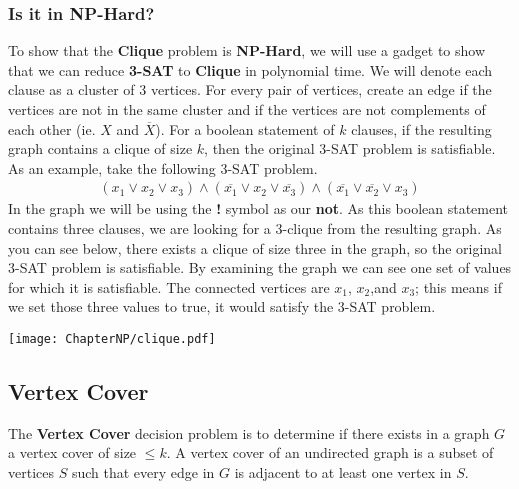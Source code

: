     \subsubsection{Is it in NP-Hard?}
        To show that the \textbf{Clique} problem is \textbf{NP-Hard}, we will use a gadget to show that we can reduce \textbf{3-SAT} to \textbf{Clique} in polynomial time. We will denote each clause as a cluster of 3 vertices. For every pair of vertices, create an edge if the vertices are not in the same cluster and if the vertices are not complements of each other (ie. $X$ and $\overline{X}$). For a boolean statement of $k$ clauses, if the resulting graph contains a clique of size $k$, then the original 3-SAT problem is satisfiable. As an example, take the following 3-SAT problem.
        \begin{align*}
            (x_1 \lor x_2 \lor x_3) \land (\overline{x_1} \lor x_2 \lor \overline{x_3}) \land (\overline{x_1} \lor \overline{x_2} \lor x_3)
        \end{align*}
        In the graph we will be using the \textbf{!} symbol as our \textbf{not}. As this boolean statement contains three clauses, we are looking for a 3-clique from the resulting graph. As you can see below, there exists a clique of size three in the graph, so the original 3-SAT problem is satisfiable. By examining the graph we can see one set of values for which it is satisfiable. The connected vertices are $x_1$, $x_2$,and $x_3$; this means if we set those three values to true, it would satisfy the 3-SAT problem.
        \begin{center}
            \texttt{[image: ChapterNP/clique.pdf]}
        \end{center}
    
\subsection{Vertex Cover}
    The \textbf{Vertex Cover} decision problem is to determine if there exists in a graph $G$ a vertex cover of size $\leq k$. A vertex cover of an undirected graph is a subset of vertices $S$ such that every edge in $G$ is adjacent to at least one vertex in $S$.
